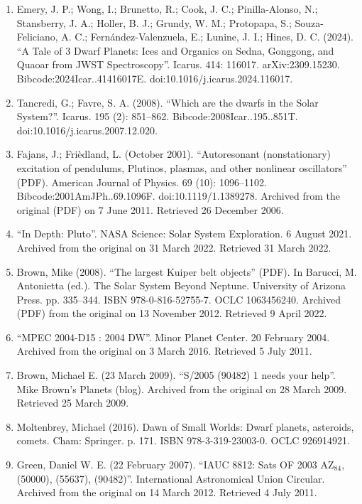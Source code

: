 \begin{enumerate}
\item Emery, J. P.; Wong, I.; Brunetto, R.; Cook, J. C.; Pinilla-Alonso, N.; Stansberry, J. A.; Holler, B. J.; Grundy, W. M.; Protopapa, S.; Souza-Feliciano, A. C.; Fernández-Valenzuela, E.; Lunine, J. I.; Hines, D. C. (2024). ``A Tale of 3 Dwarf Planets: Ices and Organics on Sedna, Gonggong, and Quaoar from JWST Spectroscopy''. Icarus. 414: 116017. arXiv:2309.15230. Bibcode:2024Icar..41416017E. doi:10.1016/j.icarus.2024.116017.
\item Tancredi, G.; Favre, S. A. (2008). ``Which are the dwarfs in the Solar System?''. Icarus. 195 (2): 851–862. Bibcode:2008Icar..195..851T. doi:10.1016/j.icarus.2007.12.020.
\item Fajans, J.; Frièdland, L. (October 2001). ``Autoresonant (nonstationary) excitation of pendulums, Plutinos, plasmas, and other nonlinear oscillators'' (PDF). American Journal of Physics. 69 (10): 1096–1102. Bibcode:2001AmJPh..69.1096F. doi:10.1119/1.1389278. Archived from the original (PDF) on 7 June 2011. Retrieved 26 December 2006.
\item ``In Depth: Pluto''. NASA Science: Solar System Exploration. 6 August 2021. Archived from the original on 31 March 2022. Retrieved 31 March 2022.
\item Brown, Mike (2008). ``The largest Kuiper belt objects'' (PDF). In Barucci, M. Antonietta (ed.). The Solar System Beyond Neptune. University of Arizona Press. pp. 335–344. ISBN 978-0-816-52755-7. OCLC 1063456240. Archived (PDF) from the original on 13 November 2012. Retrieved 9 April 2022.
\item ``MPEC 2004-D15 : 2004 DW''. Minor Planet Center. 20 February 2004. Archived from the original on 3 March 2016. Retrieved 5 July 2011.
\item Brown, Michael E. (23 March 2009). ``S/2005 (90482) 1 needs your help''. Mike Brown's Planets (blog). Archived from the original on 28 March 2009. Retrieved 25 March 2009.
\item Moltenbrey, Michael (2016). Dawn of Small Worlds: Dwarf planets, asteroids, comets. Cham: Springer. p. 171. ISBN 978-3-319-23003-0. OCLC 926914921.
\item Green, Daniel W. E. (22 February 2007). ``IAUC 8812: Sats OF 2003 AZ$_{84}$, (50000), (55637), (90482)''. International Astronomical Union Circular. Archived from the original on 14 March 2012. Retrieved 4 July 2011.


\end{enumerate}